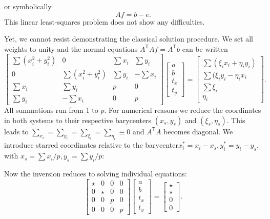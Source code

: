 or symbolically
\begin{equation*}
Af = b - e.
\end{equation*}
This linear least-squares problem does not show any difficulties.
\par
Yet, we cannot resist demonstrating the classical solution procedure. We set all
weights to unity and the normal equations $A^\mathsf{T}Af = A^\mathsf{T}b$ can be written
\begin{equation}
\begin{bmatrix}
\sum(x_{i}^{2} + y_{i}^{2}) & 0 & \sum x_i & \sum y_i\\
0 & \sum(x_{i}^{2} + y_{i}^{2}) & \sum y_i & -\sum x_i\\
\sum x_i & \sum y_i & p & 0\\
\sum y_i &-\sum x_i & 0 & p
\end{bmatrix}
\begin{bmatrix}
a\\
b\\
t_x\\
t_y
\end{bmatrix}
=
\begin{bmatrix}
\sum(\xi_ix_i + \eta_iy_i)\\
\sum(\xi_iy_i - \eta_ix_i\\
\sum\xi_i\\
\eta_i
\end{bmatrix}.
\end{equation}
All summations run from 1 to $p$. For numerical reasons we reduce the coordinates in both
systems to their respective barycenters $(x_s, y_s)$ and $(\xi_s, \eta_s)$. This leads to $\sum_{x_i} = \sum_{y_i} = \sum_{\xi_i} = \sum_{\eta_i} \equiv 0$ and $A^\mathsf{T}A$ becomes diagonal. We introduce starred coordinates relative to the barycenter$x_{i}^{*} = x_i - x_s, y_{i}^{*} = y_i - y_s$, with $x_s = \sum x_i/p, y_s = \sum y_i/p$:
\par
Now the inversion reduces to solving individual equations:
\begin{equation*}
\begin{bmatrix}
\star & 0 & 0 & 0\\
0 & \star & 0 & 0\\
0 & 0 & p & 0\\
0 & 0 &0 & p
\end{bmatrix}
\begin{bmatrix}
a\\
b\\
t_x\\
t_y
\end{bmatrix}
=
\begin{bmatrix}
\star\\
\star\\
0\\
0
\end{bmatrix}.
\end{equation*}
